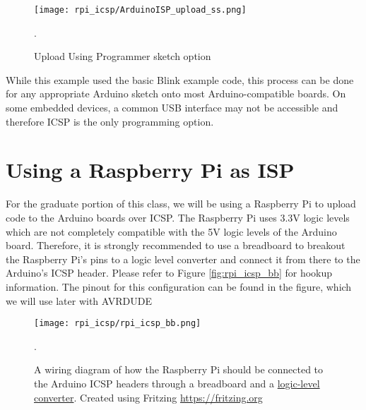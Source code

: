 \begin{figure}
    \texttt{[image: rpi\_icsp/ArduinoISP\_upload\_ss.png]}
    \caption[ArduinoISP Upload]{Upload Using Programmer sketch option}.
\end{figure}

While this example used the basic Blink example code, this process can be done for any appropriate Arduino sketch onto most Arduino-compatible boards. 
On some embedded devices, a common USB interface may not be accessible and therefore ICSP is the only programming option.

\section*{Using a Raspberry Pi as ISP}

For the graduate portion of this class, we will be using a Raspberry Pi to upload code to the Arduino boards over ICSP. 
The Raspberry Pi uses 3.3V logic levels which are not completely compatible with the 5V logic levels of the Arduino board.
Therefore, it is strongly recommended to use a breadboard to breakout the Raspberry Pi's pins to a logic level converter
and connect it from there to the Arduino's ICSP header. Please refer to Figure \ref{fig:rpi_icsp_bb} for hookup information. 
The pinout for this configuration can be found in the figure, which we will use later with AVRDUDE

    \begin{figure}[h!]
        \texttt{[image: rpi\_icsp/rpi\_icsp\_bb.png]}
        \caption[Raspberry Pi ISP Breadboard]{A wiring diagram of how the Raspberry Pi should be connected to the Arduino ICSP headers through a breadboard and a \href{https://www.adafruit.com/product/757}{logic-level     converter}. 
        Created using Fritzing \url{https://fritzing.org}}.
    \end{figure}

